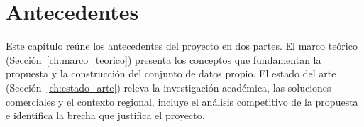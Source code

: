 \chapter{Antecedentes}
\label{ch:antecedentes}

Este capítulo reúne los antecedentes del proyecto en dos partes. El marco teórico (Sección~\ref{ch:marco_teorico}) presenta los conceptos que fundamentan la propuesta y la construcción del conjunto de datos propio. El estado del arte (Sección~\ref{ch:estado_arte}) releva la investigación académica, las soluciones comerciales y el contexto regional, incluye el análisis competitivo de la propuesta e identifica la brecha que justifica el proyecto.




